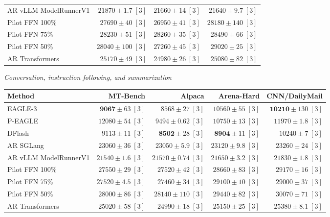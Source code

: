 \begin{table}[!tp]
\begin{tabular}{@{}>{\raggedright\arraybackslash}p{3.7cm}rrr@{}}
AR \textperiodcentered{} vLLM ModelRunnerV1 & \(21870 \pm 1.7\;[3]\) & \(21660 \pm 14\;[3]\) & \(21640 \pm 9.7\;[3]\) \\
Pilot FFN 100\% & \(27690 \pm 40\;[3]\) & \(26950 \pm 41\;[3]\) & \(28180 \pm 140\;[3]\) \\
Pilot FFN 75\% & \(28230 \pm 51\;[3]\) & \(28260 \pm 35\;[3]\) & \(28490 \pm 66\;[3]\) \\
Pilot FFN 50\% & \(28040 \pm 100\;[3]\) & \(27260 \pm 45\;[3]\) & \(29020 \pm 25\;[3]\) \\
AR \textperiodcentered{} Transformers & \(25170 \pm 49\;[3]\) & \(24980 \pm 26\;[3]\) & \(25080 \pm 82\;[3]\) \\
\bottomrule
\end{tabular}
\par\medskip
\textit{Conversation, instruction following, and summarization}\par\smallskip
\begin{tabular}{@{}>{\raggedright\arraybackslash}p{3.7cm}rrrr@{}}
\toprule
Method & MT-Bench & Alpaca & Arena-Hard & CNN/DailyMail \\
\midrule
EAGLE-3 & \(\mathbf{9067} \pm 63\;[3]\) & \(8568 \pm 27\;[3]\) & \(10560 \pm 55\;[3]\) & \(\mathbf{10210} \pm 130\;[3]\) \\
P-EAGLE & \(12080 \pm 54\;[3]\) & \(9494 \pm 0.62\;[3]\) & \(10750 \pm 13\;[3]\) & \(11970 \pm 1.8\;[3]\) \\
DFlash & \(9113 \pm 11\;[3]\) & \(\mathbf{8502} \pm 28\;[3]\) & \(\mathbf{8904} \pm 11\;[3]\) & \(10240 \pm 7\;[3]\) \\
AR \textperiodcentered{} SGLang & \(23060 \pm 36\;[3]\) & \(23050 \pm 5.9\;[3]\) & \(23120 \pm 9.8\;[3]\) & \(23260 \pm 24\;[3]\) \\
AR \textperiodcentered{} vLLM ModelRunnerV1 & \(21540 \pm 1.6\;[3]\) & \(21570 \pm 0.74\;[3]\) & \(21650 \pm 3.2\;[3]\) & \(21830 \pm 1.8\;[3]\) \\
Pilot FFN 100\% & \(27550 \pm 29\;[3]\) & \(27520 \pm 42\;[3]\) & \(28660 \pm 83\;[3]\) & \(29170 \pm 16\;[3]\) \\
Pilot FFN 75\% & \(27520 \pm 4.5\;[3]\) & \(27460 \pm 34\;[3]\) & \(29100 \pm 10\;[3]\) & \(29000 \pm 37\;[3]\) \\
Pilot FFN 50\% & \(28000 \pm 86\;[3]\) & \(28140 \pm 110\;[3]\) & \(29440 \pm 82\;[3]\) & \(30070 \pm 71\;[3]\) \\
AR \textperiodcentered{} Transformers & \(25020 \pm 58\;[3]\) & \(24990 \pm 18\;[3]\) & \(25150 \pm 25\;[3]\) & \(25380 \pm 8.1\;[3]\) \\

\end{tabular}
\end{table}

